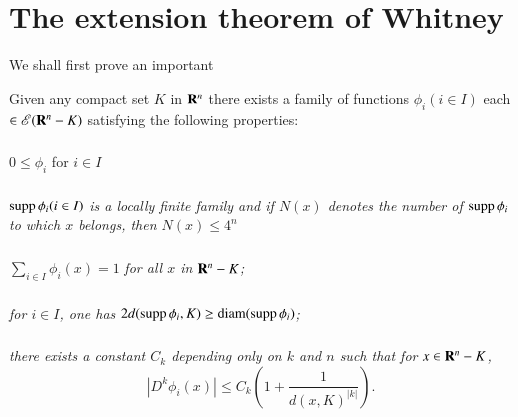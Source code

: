 \section{The extension theorem of Whitney}\label{chap1-sec3}

We shall first prove an important

\begin{lemma}\label{chap1-lem3.1}
Given any compact set $K$ in $\mathbf{R}^{n}$ there exists a family of functions $\phi_{i}(i\in I)$ each $\in \mathscr{E}(\mathbf{R}^{n}-K)$ satisfying the following properties:
\end{lemma}

\setcounter{subsection}{1}
\subsubsection{}\label{chap1-sec3.1.1}\pageoriginale
$0\leq \phi_{i}$ for $i\in I$

\subsubsection{}\label{chap1-sec3.1.2}
$\operatorname{supp} \phi_{i}(i\in I)$ {\em is a locally finite family and if $N(x)$ denotes the number of $\operatorname{supp} \phi_{i}$ to which $x$ belongs, then $N(x)\leq 4^{n}$}

\subsubsection{}\label{chap1-sec3.1.3}
$\sum\limits_{i\in I}\phi_{i}(x)=1$ {\em for all $x$ in $\mathbf{R}^{n}-K$;}

\subsubsection{}\label{chap1-sec3.1.4}
{\em for $i\in I$, one has $2d(\operatorname{supp} \phi_{i},K)\geq \operatorname{diam} (\operatorname{supp} \phi_{i})$;}

\subsubsection{}\label{chap1-sec3.1.5}
{\em there exists a constant $C_{k}$ depending only on $k$ and $n$ such that for $x\in \mathbf{R}^{n}-K$,}
$$
|D^{k}\phi_{i}(x)|\leq C_{k}\left(1+\dfrac{1}{d(x,K)^{|k|}}\right).
$$

